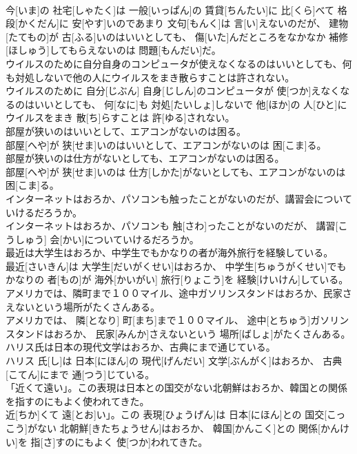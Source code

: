 \documentclass[8pt]{extreport}
\begin{document}
\begin{CJK}{UTF8}{min}
\\	今[いま]の 社宅[しゃたく]は 一般[いっぱん]の 賃貸[ちんたい]に 比[くら]べて 格段[かくだん]に 安[やす]いのであまり 文句[もんく]は 言[い]えないのだが、 建物[たてもの]が 古[ふる]いのはいいとしても、 傷[いた]んだところをなかなか 補修[ほしゅう]してもらえないのは 問題[もんだい]だ。
\\	ウイルスのために自分自身のコンピュータが使えなくなるのはいいとしても、何も対処しないで他の人にウイルスをまき散らすことは許されない。	
\\	ウイルスのために 自分[じぶん] 自身[じしん]のコンピュータが 使[つか]えなくなるのはいいとしても、 何[なに]も 対処[たいしょ]しないで 他[ほか]の 人[ひと]にウイルスをまき 散[ち]らすことは 許[ゆる]されない。
\\	部屋が狭いのはいいとして、エアコンがないのは困る。	
\\	部屋[へや]が 狭[せま]いのはいいとして、エアコンがないのは 困[こま]る。
\\	部屋が狭いのは仕方がないとしても、エアコンがないのは困る。	
\\	部屋[へや]が 狭[せま]いのは 仕方[しかた]がないとしても、エアコンがないのは 困[こま]る。
\\	インターネットはおろか、パソコンも触ったことがないのだが、講習会についていけるだろうか。	
\\	インターネットはおろか、パソコンも 触[さわ]ったことがないのだが、 講習[こうしゅう] 会[かい]についていけるだろうか。
\\	最近は大学生はおろか、中学生でもかなりの者が海外旅行を経験している。	
\\	最近[さいきん]は 大学生[だいがくせい]はおろか、 中学生[ちゅうがくせい]でもかなりの 者[もの]が 海外[かいがい] 旅行[りょこう]を 経験[けいけん]している。
\\	アメリカでは、隣町まで１００マイル、途中ガソリンスタンドはおろか、民家さえないという場所がたくさんある。	
\\	アメリカでは、 隣[となり] 町[まち]まで１００マイル、 途中[とちゅう]ガソリンスタンドはおろか、 民家[みんか]さえないという 場所[ばしょ]がたくさんある。
\\	ハリス氏は日本の現代文学はおろか、古典にまで通じている。	
\\	ハリス 氏[し]は 日本[にほん]の 現代[げんだい] 文学[ぶんがく]はおろか、 古典[こてん]にまで 通[つう]じている。
\\	「近くて遠い」。この表現は日本との国交がない北朝鮮はおろか、韓国との関係を指すのにもよく使われてきた。	
\\	近[ちか]くて 遠[とお]い」。この 表現[ひょうげん]は 日本[にほん]との 国交[こっこう]がない 北朝鮮[きたちょうせん]はおろか、 韓国[かんこく]との 関係[かんけい]を 指[さ]すのにもよく 使[つか]われてきた。

\end{CJK}
\end{document}
